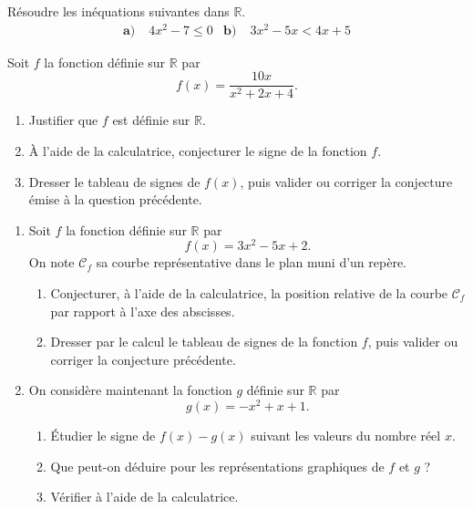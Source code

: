 \documentclass[11pt]{article}
\begin{document}
\begin{exo}
  Résoudre les inéquations suivantes dans $\mathbb{R}$.
  \begin{align*}
    \textbf{a)}&\; 4x^2-7\leq 0 &
    \textbf{b)}&\; 3x^2-5x < 4x+5
  \end{align*}
\end{exo}

\begin{exo}
  Soit $f$ la fonction définie sur $\mathbb{R}$ par
  \[
    f(x) = \frac{10x}{x^2+2x+4}.
  \]
  \begin{enumerate}
    \item Justifier que $f$ est définie sur $\mathbb{R}$.
    \item À l'aide de la calculatrice, conjecturer le signe de la fonction $f$.
    \item Dresser le tableau de signes de $f(x)$, puis valider ou corriger la
      conjecture émise à la question précédente.
  \end{enumerate}
\end{exo}

\begin{exo}
  \begin{enumerate}
    \item Soit $f$ la fonction définie sur $\mathbb{R}$ par
      \[
        f(x) = 3x^2-5x+2.
      \]
      On note $\mathscr C_f$ sa courbe représentative dans le plan muni d'un
      repère.
      \begin{enumerate}
        \item Conjecturer, à l'aide de la calculatrice, la position relative de
          la courbe $\mathscr C_f$ par rapport à l'axe des abscisses.
        \item Dresser par le calcul le tableau de signes de la fonction $f$,
          puis valider ou corriger la conjecture précédente.
      \end{enumerate}
    \item On considère maintenant la fonction $g$ définie sur $\mathbb{R}$ par
      \[
        g(x) = -x^2+x+1.
      \]
      \begin{enumerate}
        \item Étudier le signe de $f(x)-g(x)$ suivant les valeurs du nombre réel
          $x$.
        \item Que peut-on déduire pour les représentations graphiques de $f$ et
          $g$ ?
        \item Vérifier à l'aide de la calculatrice.
      \end{enumerate}
  \end{enumerate}
\end{exo}
\end{document}
